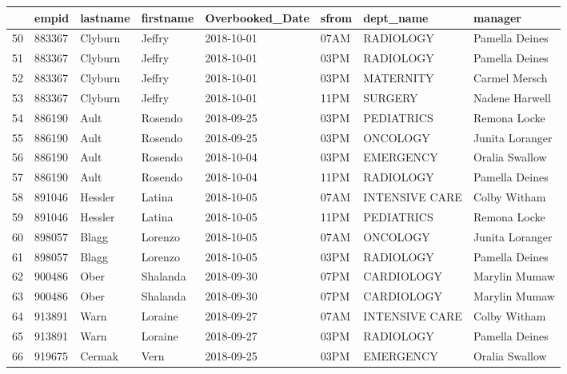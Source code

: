\documentclass[11pt]{article}
\begin{document}
\begin{tabular}{|l|l|l|l|l|l|l|l|}
	\toprule
	{} &   empid &    lastname & firstname & Overbooked\_Date & sfrom &       dept\_name &          manager \\
	\midrule
	50 &  883367 &     Clyburn &    Jeffry &      2018-10-01 &  07AM &       RADIOLOGY &   Pamella Deines \\
	51 &  883367 &     Clyburn &    Jeffry &      2018-10-01 &  03PM &       RADIOLOGY &   Pamella Deines \\
	52 &  883367 &     Clyburn &    Jeffry &      2018-10-01 &  03PM &       MATERNITY &    Carmel Mersch \\
	53 &  883367 &     Clyburn &    Jeffry &      2018-10-01 &  11PM &         SURGERY &   Nadene Harwell \\
	54 &  886190 &        Ault &   Rosendo &      2018-09-25 &  03PM &      PEDIATRICS &     Remona Locke \\
	55 &  886190 &        Ault &   Rosendo &      2018-09-25 &  03PM &        ONCOLOGY &  Junita Loranger \\
	56 &  886190 &        Ault &   Rosendo &      2018-10-04 &  03PM &       EMERGENCY &   Oralia Swallow \\
	57 &  886190 &        Ault &   Rosendo &      2018-10-04 &  11PM &       RADIOLOGY &   Pamella Deines \\
	58 &  891046 &     Hessler &    Latina &      2018-10-05 &  07AM &  INTENSIVE CARE &     Colby Witham \\
	59 &  891046 &     Hessler &    Latina &      2018-10-05 &  11PM &      PEDIATRICS &     Remona Locke \\
	60 &  898057 &       Blagg &   Lorenzo &      2018-10-05 &  07AM &        ONCOLOGY &  Junita Loranger \\
	61 &  898057 &       Blagg &   Lorenzo &      2018-10-05 &  03PM &       RADIOLOGY &   Pamella Deines \\
	62 &  900486 &        Ober &  Shalanda &      2018-09-30 &  07PM &      CARDIOLOGY &    Marylin Mumaw \\
	63 &  900486 &        Ober &  Shalanda &      2018-09-30 &  07PM &      CARDIOLOGY &    Marylin Mumaw \\
	64 &  913891 &        Warn &   Loraine &      2018-09-27 &  07AM &  INTENSIVE CARE &     Colby Witham \\
	65 &  913891 &        Warn &   Loraine &      2018-09-27 &  03PM &       RADIOLOGY &   Pamella Deines \\
	66 &  919675 &      Cermak &      Vern &      2018-09-25 &  03PM &       EMERGENCY &   Oralia Swallow \\

\end{tabular}
\end{document}
